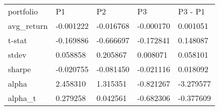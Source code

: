 \begin{tabular}{lllll}
\toprule
\midrule
portfolio & P1 & P2 & P3 & P3 - P1 \\
avg_return & -0.001222 & -0.016768 & -0.000170 & 0.001051 \\
t-stat & -0.169886 & -0.666697 & -0.172841 & 0.148087 \\
stdev & 0.058858 & 0.205867 & 0.008071 & 0.058101 \\
sharpe & -0.020755 & -0.081450 & -0.021116 & 0.018092 \\
alpha & 2.458310 & 1.315351 & -0.821267 & -3.279577 \\
alpha_t & 0.279258 & 0.042561 & -0.682306 & -0.377609 \\
\bottomrule
\end{tabular}
